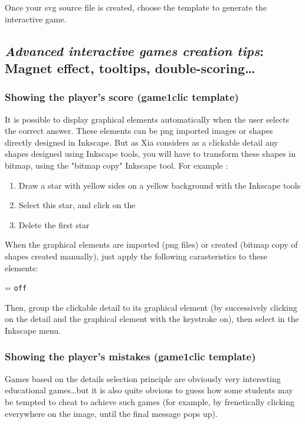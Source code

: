 Once your svg source file is created, choose the template  to generate the interactive game.

\subsection{\emph{Advanced interactive games creation tips}: Magnet effect, tooltips, double-scoring\ldots}

\subsubsection{Showing the player's score (game1clic template)}\label{playersscore}

It is possible to display graphical elements automatically  when the user 
selects the correct answer. These elements can be png imported images or shapes directly designed in
Inkscape.
But as Xia considers as a clickable 
detail any shapes designed using Inkscape tools, you 
will have to transform these shapes in bitmap, using the "bitmap copy" Inkscape tool. 
For example :
\begin{enumerate}
 \item Draw  a star with yellow sides on a yellow background with the Inkscape tools 
 \item Select this star, and click on the 
 \item Delete the first star
\end{enumerate}

When the graphical elements are imported (png files) or created (bitmap copy 
of shapes created manually), just apply the following 
carasteristics to these elements:
\begin{center}
 = \verb|off|
\end{center}
Then, group the clickable detail to its graphical element (by successively 
clicking on the detail and the graphical element with the \Shift keystroke on),
then select  in the Inkscape  menu.

\subsubsection{Showing the player's mistakes (game1clic template)}

Games based on the details selection principle are obviously very
interesting educational games\ldots but it is also quite obvious to guess how some 
students may be tempted to cheat to achieve such games (for example, by 
frenetically clicking everywhere on the image, until the final message pops up).

